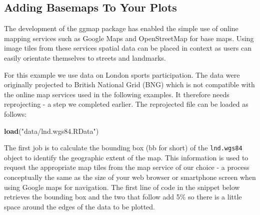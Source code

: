 \documentclass[]{article}
\newenvironment{Shaded}{}{}
\newcommand{\KeywordTok}[1]{\textcolor[rgb]{0.00,0.44,0.13}{\textbf{{#1}}}}
\newcommand{\DecValTok}[1]{\textcolor[rgb]{0.25,0.63,0.44}{{#1}}}
\newcommand{\FloatTok}[1]{\textcolor[rgb]{0.25,0.63,0.44}{{#1}}}
\newcommand{\StringTok}[1]{\textcolor[rgb]{0.25,0.44,0.63}{{#1}}}
\newcommand{\CommentTok}[1]{\textcolor[rgb]{0.38,0.63,0.69}{\textit{{#1}}}}
\newcommand{\NormalTok}[1]{{#1}}
\begin{document}
\subsection{Adding Basemaps To Your Plots}

The development of the ggmap package has enabled the simple use of
online mapping services such as Google Maps and OpenStreetMap for base
maps. Using image tiles from these services spatial data can be placed
in context as users can easily orientate themselves to streets and
landmarks.

For this example we use data on London sports participation. The data
were originally projected to British National Grid (BNG) which is not
compatible with the online map services used in the following examples.
It therefore needs reprojecting - a step we completed earlier. The
reprojected file can be loaded as follows:

\begin{Shaded}
\begin{Highlighting}[]
\KeywordTok{load}\NormalTok{(}\StringTok{"data/lnd.wgs84.RData"}\NormalTok{)}
\end{Highlighting}
\end{Shaded}

The first job is to calculate the bounding box (bb for short) of the
\texttt{lnd.wgs84} object to identify the geographic extent of the map.
This information is used to request the appropriate map tiles from the
map service of our choice - a process conceptually the same as the size
of your web browser or smartphone screen when using Google maps for
navigation. The first line of code in the snippet below retrieves the
bounding box and the two that follow add 5\% so there is a little space
around the edges of the data to be plotted.

\begin{Shaded}
\end{Shaded}
\end{document}

